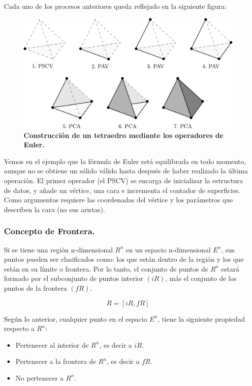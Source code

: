 Cada uno de los procesos anteriores queda reflejado en la siguiente figura:
\begin{figure}[h]
\includegraphics[width=12cm]{Img/GEO/geo-euler5.jpg}
\centering
\caption{\textbf{\footnotesize{Construcción de un tetraedro mediante los operadores de Euler.}}}
\end{figure}

Vemos en el ejemplo que la fórmula de Euler está equilibrada en todo momento, aunque no se obtiene un sólido válido hasta después de haber realizado la última operación. El primer operador (el PSCV) se encarga de inicializar la estructura de datos, y añade un vértice, una cara e incrementa el contador de superficies. Como argumentos requiere las coordenadas del vértice y los parámetros que describen la cara (no sus aristas).

\subsubsection{ Concepto de Frontera. }

Si se tiene una región n-dimensional $R^n$ en un espacio n-dimensional $E^n$, sus puntos pueden ser clasificados como: los que están dentro de la región y
los que están en su límite o frontera. Por lo tanto, el conjunto de puntos de $R^n$ estará formado por el subconjunto de puntos interior $(iR)$, más el conjunto de los puntos de la frontera $(fR)$.

\begin{equation}
R = [iR, fR]
\end{equation}

Según lo anterior, cualquier punto en el espacio $E^n$, tiene la siguiente propiedad respecto a $R^n$:

\begin{itemize}
\item Pertenecer al interior de $R^n$, es decir a $iR$. 
\item Pertenecer a la frontera de $R^n$, es decir a $fR$.
\item No pertenecer a $R^n$. 
\end{itemize}


